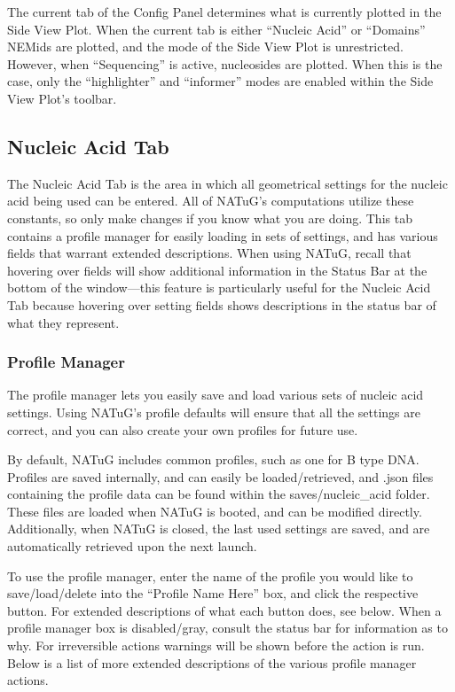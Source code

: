 \documentclass[titlepage]{article}
\begin{document}
	The current tab of the Config Panel determines what is currently plotted in the Side View Plot. When the current tab is either “Nucleic Acid” or “Domains” NEMids are plotted, and the mode of the Side View Plot is unrestricted. However, when “Sequencing” is active, nucleosides are plotted. When this is the case, only the “highlighter” and “informer” modes are enabled within the Side View Plot’s toolbar.
	
	\subsection{Nucleic Acid Tab} \label{sect:nucleic-acid-tab}
	
	The Nucleic Acid Tab is the area in which all geometrical settings for the nucleic acid being used can be entered. All of NATuG’s computations utilize these constants, so only make changes if you know what you are doing. This tab contains a profile manager for easily loading in sets of settings, and has various fields that warrant extended descriptions. When using NATuG, recall that hovering over fields will show additional information in the Status Bar at the bottom of the window---this feature is particularly useful for the Nucleic Acid Tab because hovering over setting fields shows descriptions in the status bar of what they represent.
	
	\subsubsection{Profile Manager}
	
	The profile manager lets you easily save and load various sets of nucleic acid settings. Using NATuG’s profile defaults will ensure that all the settings are correct, and you can also create your own profiles for future use.
	
	By default, NATuG includes common profiles, such as one for B type DNA. Profiles are saved internally, and can easily be loaded/retrieved, and .json files containing the profile data can be found within the saves/nucleic\_acid folder. These files are loaded when NATuG is booted, and can be modified directly. Additionally, when NATuG is closed, the last used settings are saved, and are automatically retrieved upon the next launch.
	
	To use the profile manager, enter the name of the profile you would like to save/load/delete into the “Profile Name Here” box, and click the respective button. For extended descriptions of what each button does, see below. When a profile manager box is disabled/gray, consult the status bar for information as to why. For irreversible actions warnings will be shown before the action is run. Below is a list of more extended descriptions of the various profile manager actions.
	
\end{document}
